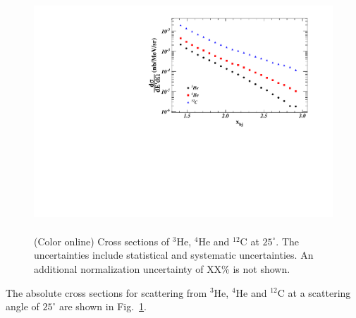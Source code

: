 

                \begin{figure}[!ht]
		\begin{center}
		\includegraphics[height=9.0cm,angle=270]{./figures/XS_Comp_25_May27}
		\end{center}
		\vspace*{-5mm}
		\caption{(Color online) Cross sections of $^{3}$He, $^{4}$He and $^{12}$C at $25^{\circ}$. The uncertainties include statistical and
		systematic uncertainties. An additional normalization uncertainty of XX\% is not shown.}
		\label{xs}
		\end{figure}

The absolute cross sections for scattering from $^{3}$He, $^{4}$He and $^{12}$C at a scattering angle of $25^{\circ}$ are shown in Fig.~\ref{xs}.


